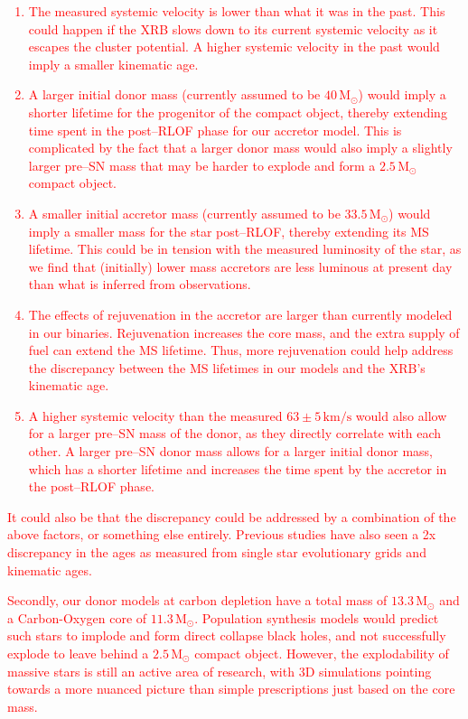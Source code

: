 \documentclass[linenumbers,trackchanges,twocolumn]{aastex701}
\newcommand{\Mdot}{\mathrm{M}_{\odot}}
\newcommand{\red}{\textcolor{red}}
\begin{document}
\red{
\begin{enumerate}
    \item The measured systemic velocity is lower than what it was in the past. This could happen if the XRB slows down to its current systemic velocity as it escapes the cluster potential. A higher systemic velocity in the past would imply a smaller kinematic age.
    \item A larger initial donor mass (currently assumed to be $40\,\Mdot$) would imply a shorter lifetime for the progenitor of the compact object, thereby extending time spent in the post--RLOF phase for our accretor model. This is complicated by the fact that a larger donor mass would also imply a slightly larger pre--SN mass that may be harder to explode and form a $2.5\,\Mdot$ compact object.
    \item A smaller initial accretor mass (currently assumed to be $33.5\,\Mdot$) would imply a smaller mass for the star post--RLOF, thereby extending its MS lifetime. This could be in tension with the measured luminosity of the star, as we find that (initially) lower mass accretors are less luminous at present day than what is inferred from observations.
    \item The effects of rejuvenation in the accretor are larger than currently modeled in our binaries. Rejuvenation increases the core mass, and the extra supply of fuel can extend the MS lifetime. Thus, more rejuvenation could help address the discrepancy between the MS lifetimes in our models and the XRB's kinematic age.
    \item A higher systemic velocity than the measured $63\pm 5\, \mathrm{km/s}$ would also allow for a larger pre--SN mass of the donor, as they directly correlate with each other. A larger pre--SN donor mass allows for a larger initial donor mass, which has a shorter lifetime and increases the time spent by the accretor in the post--RLOF phase. 
\end{enumerate}
}
\red{It could also be that the discrepancy could be addressed by a combination of the above factors, or something else entirely. Previous studies have also seen a 2x discrepancy in the ages as measured from single star evolutionary grids and kinematic ages.}

\red{Secondly, our donor models at carbon depletion have a total mass of $13.3\,\Mdot$ and a Carbon-Oxygen core of $11.3\,\Mdot$. Population synthesis models would predict such stars to implode and form direct collapse black holes, and not successfully explode to leave behind a $2.5\,\Mdot$ compact object. However, the explodability of massive stars is still an active area of research, with 3D simulations pointing towards a more nuanced picture than simple prescriptions just based on the core mass.} 
\end{document}
